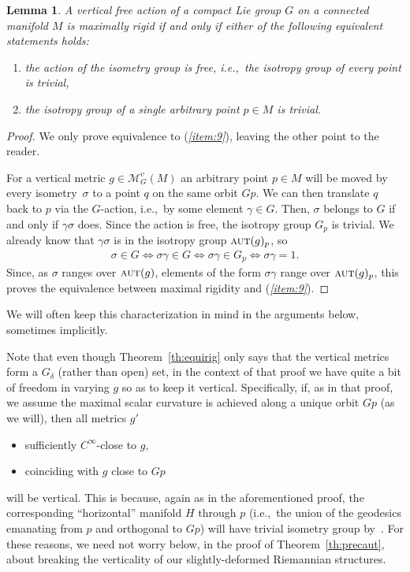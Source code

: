 \documentclass[10pt,a4paper]{amsart}
\numberwithin{equation}{section}
\newtheorem{Lemma}[Theorem]{Lemma}
\newcommand{\cat}[1]{\textsc{#1}}
\begin{document}
\begin{Lemma}\label{le:charmax}
 A vertical free action of a compact Lie group $G$ on a connected manifold $M$ is maximally rigid if and only if either of the following equivalent statements holds:
 \begin{enumerate}[$(a)$]\itemsep=0pt
 \item%
 the action of the isometry group is free, i.e.,~the isotropy group of every point is trivial,
 \item\label{item:9}
 the isotropy group of a {\it single} arbitrary point $p\in M$ is trivial.
 \end{enumerate}
\end{Lemma}
\begin{proof}
 We only prove equivalence to ({\it \ref{item:9}}), leaving the other point to the reader.

 For a vertical metric $g\in \mathcal{M}_G^v(M)$ an arbitrary point $p\in M$ will be moved by every isometry~$\sigma$ to a point $q$ on the same orbit $Gp$. We can then translate $q$ back to $p$ via the $G$-action, i.e.,~by some element $\gamma\in G$. Then, $\sigma$ belongs to $G$ if and only if $\gamma\sigma$ does. Since the action is free, the isotropy group $G_p$ is trivial. We already know that $\gamma\sigma$ is in the isotropy group $\cat{aut}(g)_p$, so
 \begin{gather*}
 \sigma\in G\iff \sigma\gamma\in G\iff \sigma\gamma\in G_p\iff \sigma\gamma=1.
 \end{gather*}
 Since, as $\sigma$ ranges over $\cat{aut}(g)$, elements of the form $\sigma\gamma$ range over $\cat{aut}(g)_p$, this proves the equivalence between maximal rigidity and ({\it \ref{item:9}}).
\end{proof}

We will often keep this characterization in mind in the arguments below, sometimes implicitly.

Note that even though Theorem~\ref{th:equirig} only says that the vertical metrics form a $G_{\delta}$ (rather than open) set, in the context of that proof we have quite a bit of freedom in varying $g$ so as to keep it vertical. Specifically, if, as in that proof, we assume the maximal scalar curvature is achieved along a unique orbit $Gp$ (as we will), then all metrics $g'$
\begin{itemize}\itemsep=0pt
\item sufficiently $C^{\infty}$-close to $g$,
\item coinciding with $g$ close to $Gp$
\end{itemize}
will be vertical. This is because, again as in the aforementioned proof, the corresponding ``horizontal'' manifold $H$ through $p$ (i.e.,~the union of the geodesics emanating from $p$ and orthogonal to $Gp$) will have trivial isometry group by~\cite[Proposition~8.3]{eb}. For these reasons, we need not worry below, in the proof of Theorem~\ref{th:precaut}, about breaking the verticality of our slightly-deformed Riemannian structures.
\end{document}
